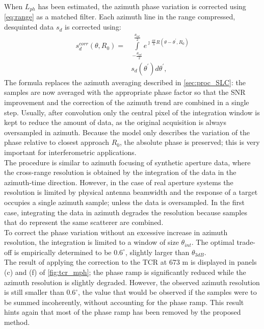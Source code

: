 When $L_{ph}$ has been estimated, the azimuth phase variation is corrected using \autoref{eq:range} as a matched filter. Each azimuth line in the range compressed, desquinted data $s_{d}$ is corrected using:
\begin{equation}\label{eq:correction}
	\begin{aligned}
		s_{d}^{corr}\left(\theta, R_{0}\right) = &\int\limits_{-\frac{\theta_{int}}{2}}^{\frac{\theta_{int}}{2}}e^{\jmath \frac{4\pi}{\lambda}R\left(\theta - \theta^{\prime}, R_{0}\right)}\\
		&s_{d}\left(\theta^\prime\right) d\theta^\prime,
	\end{aligned}
\end{equation}
The formula replaces the azimuth averaging described in \autoref{sec:proc_SLC}: the samples are now averaged with the appropriate phase factor so that the SNR improvement and the correction of the azimuth trend are combined in a single step. Usually, after convolution only the central pixel of the integration window is kept to reduce the amount of data, as the original acquisition is always oversampled in azimuth. Because the model only describes the variation of the phase relative to closest approach $R_{0}$, the absolute phase is preserved; this is very important for interferometric applications.\\
The procedure is similar to azimuth focusing of synthetic aperture data, where the cross-range resolution is obtained by the integration of the data in the azimuth-time direction. However, in the case of real aperture systems the resolution is limited by physical antenna beamwidth and the response of a target  occupies a single azimuth sample; unless the data is oversampled. In the first case, integrating the data in azimuth degrades the resolution because samples that do represent the same scatterer are combined.\\ To correct the phase variation without an excessive increase in azimuth resolution, the integration is limited to a window of size $\theta_{int}$. The optimal trade-off is empirically determined to be $0.6^\circ$, slightly larger than $\theta_{3dB}$.\\
The result of applying the correction to the TCR at 673 m is displayed in panels (c) and (f) of \autoref{fig:tcr_mph}; the phase ramp is significantly reduced while the azimuth resolution is slightly degraded. However, the observed azimuth resolution is still smaller than $0.6^\circ$, the value that would be observed if the samples were to be summed incoherently, without accounting for the phase ramp. This result hints again that  most of the phase ramp has been removed by the proposed method.\\
